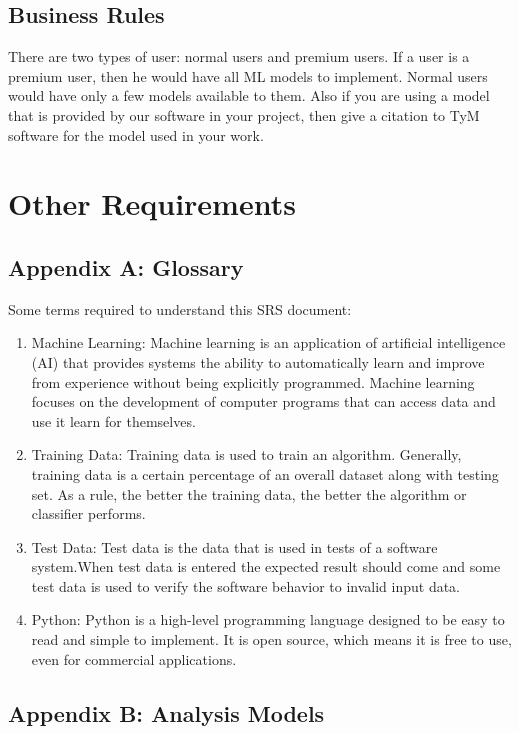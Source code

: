 \documentclass[12pt]{scrreprt}
\begin{document}
\section{Business Rules}
There are two types of user: normal users and premium users. If a user is a premium user, then he would have all ML models to implement. Normal users would have only a few models available to them. Also if you are using a model that is provided by our software in your project, then give a citation to TyM software for the model used in your work.


\chapter{Other Requirements}

\section{Appendix A: Glossary}
Some terms required to understand this SRS document: 
\begin{enumerate}
\item Machine Learning: Machine learning is an application of artificial intelligence (AI) that provides systems the ability to automatically learn and improve from experience without being explicitly programmed. Machine learning focuses on the development of computer programs that can access data and use it learn for themselves.
\item Training Data: Training data is used to train an algorithm. Generally, training data is a certain percentage of an overall dataset along with testing set. As a rule, the better the training data, the better the algorithm or classifier performs.
\item Test Data: Test data is the data that is used in tests of a software system.When test data is entered the expected result should come and some test data is used to verify the software behavior to invalid input data.
\item Python: Python is a high-level programming language designed to be easy to read and simple to implement. It is open source, which means it is free to use, even for commercial applications.
\end{enumerate}

\section{Appendix B: Analysis Models}
















\end{document}
